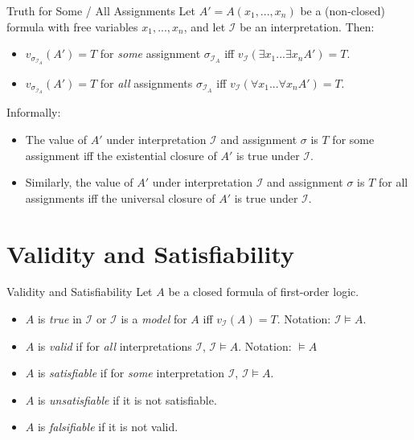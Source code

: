 \documentclass[style=sailor,size=12pt,mode=present]{powerdot}
\theoremstyle{definition}
\newenvironment{defn}[1]
  {\renewcommand\theinnerdefn{#1}\innerdefn}
  {\endinnerdefn}
\newenvironment{thm}[1]
  {\renewcommand\theinnerthm{#1}\innerthm}
  {\endinnerthm}
\begin{document}
\begin{wideslide}[bm=,toc=]{Truth for Some / All Assignments}
\begin{thm}{7.22}[Ben Ari]
Let $A' = A(x_1,...,x_n)$ be a (non-closed) formula with free variables
$x_1,...,x_n$, and let $\mathcal{I}$ be an interpretation. Then:
\end{thm}
\vspace*{-2ex}
\begin{itemize}
\item $v_{\sigma_{\mathcal{I}_A}}(A') = T$ for \emph{some} assignment $\sigma_{\mathcal{I}_A}$ iff $v_{\mathcal{I}}(\exists x_1 ... \exists x_n A') = T$.
\item $v_{\sigma_{\mathcal{I}_A}}(A') = T$ for \emph{all} assignments
$\sigma_{\mathcal{I}_A}$ iff $v_{\mathcal{I}}(\forall x_1 ... \forall x_n A') = T$.
\end{itemize}
Informally:
\begin{itemize}
\item The value of $A'$ under interpretation $\mathcal{I}$ and assignment
$\sigma$ is $T$ for some assignment iff the existential closure of $A'$ is true 
under $\mathcal{I}$. 
\item Similarly, the value of $A'$ under interpretation $\mathcal{I}$ and assignment
$\sigma$ is $T$ for all assignments iff the universal closure of $A'$ is true 
under $\mathcal{I}$. 
\end{itemize}
\end{wideslide}

\section[slide=false]{Validity and Satisfiability}

\begin{wideslide}[bm=,toc=]{Validity and Satisfiability}
\begin{defn}{7.23}[Ben Ari]
Let $A$ be a closed formula of first-order logic.
\end{defn}
\vspace{-2ex}
\begin{itemize}
\item $A$ is \emph{true} in $\mathcal{I}$ or $\mathcal{I}$ is a \emph{model} for
$A$ iff $v_{\mathcal{I}}(A) = T$. Notation: $\mathcal{I} \models A$.
\item $A$ is \emph{valid} if for \emph{all} interpretations $\mathcal{I}$,
$\mathcal{I} \models A$. Notation: $\models A$ 
\item $A$ is \emph{satisfiable} if for \emph{some} interpretation $\mathcal{I}$,
$\mathcal{I} \models A$.
\item $A$ is \emph{unsatisfiable} if it is not satisfiable. 
\item $A$ is \emph{falsifiable} if it is not valid. 
\end{itemize}

\end{wideslide}
\end{document}

